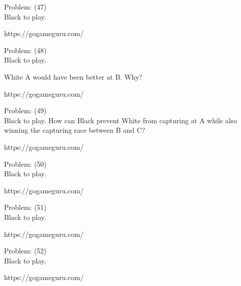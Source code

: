 \documentclass[11pt]{article}
\begin{document}
\begin{minipage}[t]{0.5\textwidth}
  {\centering
  
Problem: (47)\\
Black to play.

https://gogameguru.com/\\
  }
\end{minipage}
\begin{minipage}[t]{0.5\textwidth}
  {\centering
  
Problem: (48)\\
Black to play.

White A would have been better at B. Why?

https://gogameguru.com/\\
  }
\end{minipage}
\begin{minipage}[t]{0.5\textwidth}
  {\centering
  
Problem: (49)\\
Black to play. How can Black prevent White from capturing at A while also winning the capturing race between B and C?

https://gogameguru.com/\\
  }
\end{minipage}
\begin{minipage}[t]{0.5\textwidth}
  {\centering
  
Problem: (50)\\
Black to play.

https://gogameguru.com/\\
  }
\end{minipage}
\begin{minipage}[t]{0.5\textwidth}
  {\centering
  
Problem: (51)\\
Black to play.

https://gogameguru.com/\\
  }
\end{minipage}
\begin{minipage}[t]{0.5\textwidth}
  {\centering
  
Problem: (52)\\
Black to play.

https://gogameguru.com/\\
  }
\end{minipage}
\end{document}
